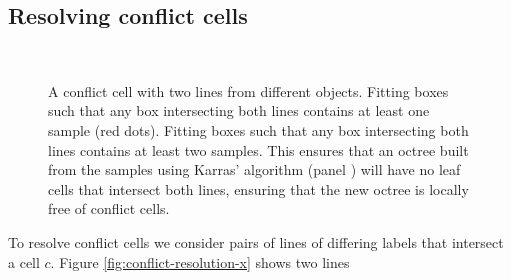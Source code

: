 \documentclass{egpubl}
\begin{document}
\subsection{Resolving conflict cells}

\begin{figure}
  \centering
   \\
  \caption{
    \protect{} A conflict cell with two lines from different objects.
    \protect{} Fitting boxes such that any box intersecting both lines contains at least one sample (red dots).
    \protect{} Fitting boxes such that any box intersecting both lines contains at least two samples. This ensures that an octree built from the samples using Karras' algorithm (panel \protect{}) will have no leaf cells that intersect both lines, ensuring that the new octree is locally free of conflict cells.
  }
  \label{fig:conflict-resolution}
\end{figure}



To resolve conflict cells we consider pairs of lines of differing labels that intersect a cell $c$. Figure \ref{fig:conflict-resolution-x} shows two lines
\end{document}
